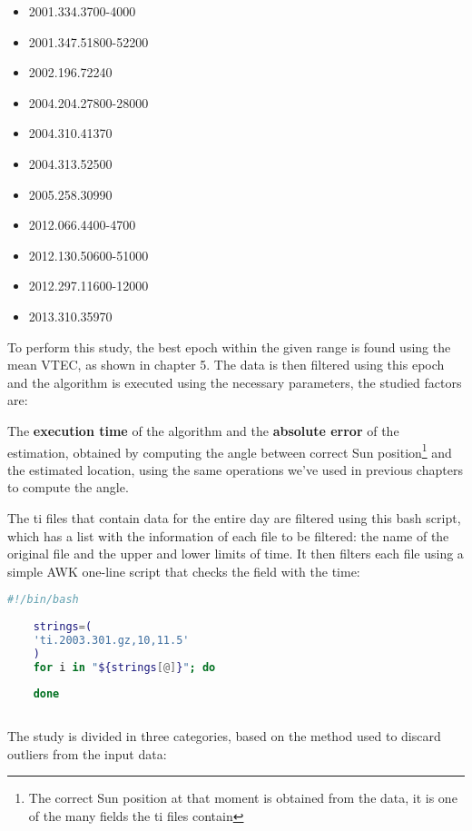 \begin{itemize}
	\item 2001.334.3700-4000
	\item 2001.347.51800-52200
	\item 2002.196.72240
	\item 2004.204.27800-28000
	\item 2004.310.41370
	\item 2004.313.52500
	\item 2005.258.30990
	\item 2012.066.4400-4700
	\item 2012.130.50600-51000
	\item 2012.297.11600-12000
	\item 2013.310.35970
\end{itemize}

To perform this study, the best epoch within the given range is found using the mean VTEC, as shown in chapter 5. The data is then filtered using this epoch and the algorithm is executed using the necessary parameters, the studied factors are:

The \textbf{execution time} of the algorithm and the \textbf{absolute error} of the estimation, obtained by computing the angle between correct Sun position\footnote{The correct Sun position at that moment is obtained from the data, it is one of the many fields the ti files contain} and the estimated location, using the same operations we've used in previous chapters to compute the angle. 

The ti files that contain data for the entire day are filtered using this bash script, which has a list with the information of each file to be filtered: the name of the original file and the upper and lower limits of time. It then filters each file using a simple AWK one-line script that checks the field with the time:

\begin{minipage}{\linewidth}
	\begin{lstlisting}[language=Bash, caption=Filtering the ti file]
	#!/bin/bash	
	
	strings=(
	'ti.2003.301.gz,10,11.5'
	)
	for i in "${strings[@]}"; do
	
	done
	
	\end{lstlisting}
\end{minipage}

The study is divided in three categories, based on the method used to discard outliers from the input data:

